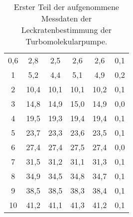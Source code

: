\begin{table}[htp]
\begin{center}
\begin{tabular}{c|ccc|cc}
			          0,6           &          2,8          &          2,5          &          2,6          &            2,6            &            0,1             \\
			           1            &          5,2          &          4,4          &          5,1          &            4,9            &            0,2             \\
			           2            &         10,4          &         10,1          &         10,1          &           10,2            &            0,1             \\
			           3            &         14,8          &         14,9          &         15,0          &           14,9            &            0,0             \\
			           4            &         19,5          &         19,3          &         19,4          &           19,4            &            0,1             \\
			           5            &         23,7          &         23,3          &         23,6          &           23,5            &            0,1             \\
			           6            &         27,4          &         27,4          &         27,5          &           27,4            &            0,0             \\
			           7            &         31,5          &         31,2          &         31,1          &           31,3            &            0,1             \\
			           8            &         34,9          &         34,5          &         34,8          &           34,7            &            0,1             \\
			           9            &         38,5          &         38,5          &         38,3          &           38,4            &            0,1             \\
			          10            &         41,2          &         41,1          &         41,3          &           41,2            &            0,1             \\ \bottomrule
		\end{tabular}
		\caption{Erster Teil der aufgenommene Messdaten der Leckratenbestimmung der Turbomolekularpumpe.}
		\label{tab9}
	\end{center}
\end{table}

